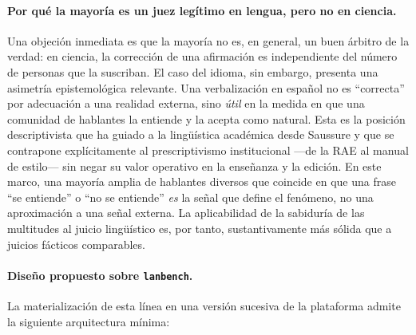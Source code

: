 \paragraph{Por qué la mayoría es un juez legítimo en lengua, pero no en
	ciencia.} Una objeción inmediata es que la mayoría no es, en general,
un buen árbitro de la verdad: en ciencia, la corrección de una
afirmación es independiente del número de personas que la suscriban. El
caso del idioma, sin embargo, presenta una asimetría epistemológica
relevante. Una verbalización en español no es ``correcta'' por
adecuación a una realidad externa, sino \emph{útil} en la medida en que
una comunidad de hablantes la entiende y la acepta como natural. Esta es
la posición descriptivista que ha guiado a la lingüística académica
desde Saussure y que se contrapone explícitamente al prescriptivismo
institucional ---de la RAE al manual de estilo--- sin negar su valor
operativo en la enseñanza y la edición. En este marco, una mayoría
amplia de hablantes diversos que coincide en que una frase ``se
entiende'' o ``no se entiende'' \emph{es} la señal que define el
fenómeno, no una aproximación a una señal externa. La aplicabilidad de
la sabiduría de las multitudes al juicio lingüístico es, por tanto,
sustantivamente más sólida que a juicios fácticos comparables.

\paragraph{Diseño propuesto sobre \texttt{lanbench}.} La materialización
de esta línea en una versión sucesiva de la plataforma admite la
siguiente arquitectura mínima:

